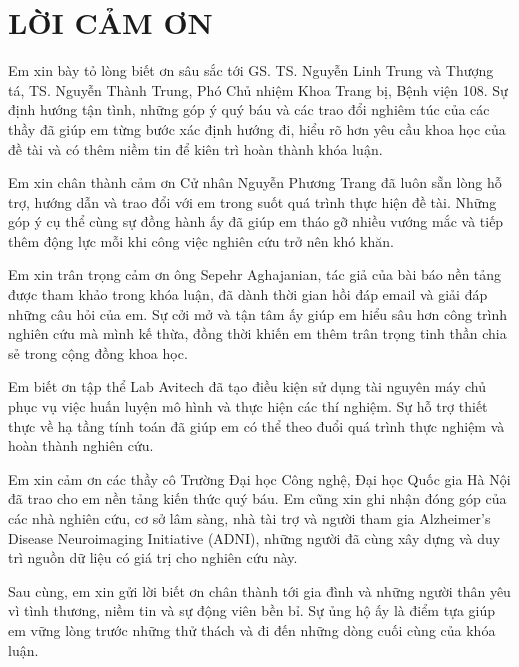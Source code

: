 \chapter*{LỜI CẢM ƠN}

Em xin bày tỏ lòng biết ơn sâu sắc tới GS. TS. Nguyễn Linh Trung và Thượng tá, TS. Nguyễn Thành Trung, Phó Chủ nhiệm Khoa Trang bị, Bệnh viện 108. Sự định hướng tận tình, những góp ý quý báu và các trao đổi nghiêm túc của các thầy đã giúp em từng bước xác định hướng đi, hiểu rõ hơn yêu cầu khoa học của đề tài và có thêm niềm tin để kiên trì hoàn thành khóa luận.

Em xin chân thành cảm ơn Cử nhân Nguyễn Phương Trang đã luôn sẵn lòng hỗ trợ, hướng dẫn và trao đổi với em trong suốt quá trình thực hiện đề tài. Những góp ý cụ thể cùng sự đồng hành ấy đã giúp em tháo gỡ nhiều vướng mắc và tiếp thêm động lực mỗi khi công việc nghiên cứu trở nên khó khăn.

Em xin trân trọng cảm ơn ông Sepehr Aghajanian, tác giả của bài báo nền tảng được tham khảo trong khóa luận, đã dành thời gian hồi đáp email và giải đáp những câu hỏi của em. Sự cởi mở và tận tâm ấy giúp em hiểu sâu hơn công trình nghiên cứu mà mình kế thừa, đồng thời khiến em thêm trân trọng tinh thần chia sẻ trong cộng đồng khoa học.

Em biết ơn tập thể Lab Avitech đã tạo điều kiện sử dụng tài nguyên máy chủ phục vụ việc huấn luyện mô hình và thực hiện các thí nghiệm. Sự hỗ trợ thiết thực về hạ tầng tính toán đã giúp em có thể theo đuổi quá trình thực nghiệm và hoàn thành nghiên cứu.

Em xin cảm ơn các thầy cô Trường Đại học Công nghệ, Đại học Quốc gia Hà Nội đã trao cho em nền tảng kiến thức quý báu. Em cũng xin ghi nhận đóng góp của các nhà nghiên cứu, cơ sở lâm sàng, nhà tài trợ và người tham gia Alzheimer's Disease Neuroimaging Initiative (ADNI), những người đã cùng xây dựng và duy trì nguồn dữ liệu có giá trị cho nghiên cứu này.

Sau cùng, em xin gửi lời biết ơn chân thành tới gia đình và những người thân yêu vì tình thương, niềm tin và sự động viên bền bỉ. Sự ủng hộ ấy là điểm tựa giúp em vững lòng trước những thử thách và đi đến những dòng cuối cùng của khóa luận.
